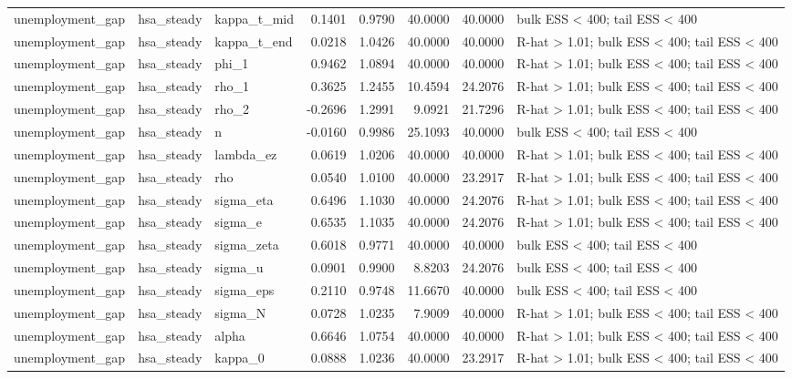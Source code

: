 \begin{tabular}{lllrrrrl}
unemployment\_gap & hsa\_steady & kappa\_t\_mid & 0.1401 & 0.9790 & 40.0000 & 40.0000 & bulk ESS < 400; tail ESS < 400 \\
unemployment\_gap & hsa\_steady & kappa\_t\_end & 0.0218 & 1.0426 & 40.0000 & 40.0000 & R-hat > 1.01; bulk ESS < 400; tail ESS < 400 \\
unemployment\_gap & hsa\_steady & phi\_1 & 0.9462 & 1.0894 & 40.0000 & 40.0000 & R-hat > 1.01; bulk ESS < 400; tail ESS < 400 \\
unemployment\_gap & hsa\_steady & rho\_1 & 0.3625 & 1.2455 & 10.4594 & 24.2076 & R-hat > 1.01; bulk ESS < 400; tail ESS < 400 \\
unemployment\_gap & hsa\_steady & rho\_2 & -0.2696 & 1.2991 & 9.0921 & 21.7296 & R-hat > 1.01; bulk ESS < 400; tail ESS < 400 \\
unemployment\_gap & hsa\_steady & n & -0.0160 & 0.9986 & 25.1093 & 40.0000 & bulk ESS < 400; tail ESS < 400 \\
unemployment\_gap & hsa\_steady & lambda\_ez & 0.0619 & 1.0206 & 40.0000 & 40.0000 & R-hat > 1.01; bulk ESS < 400; tail ESS < 400 \\
unemployment\_gap & hsa\_steady & rho & 0.0540 & 1.0100 & 40.0000 & 23.2917 & R-hat > 1.01; bulk ESS < 400; tail ESS < 400 \\
unemployment\_gap & hsa\_steady & sigma\_eta & 0.6496 & 1.1030 & 40.0000 & 24.2076 & R-hat > 1.01; bulk ESS < 400; tail ESS < 400 \\
unemployment\_gap & hsa\_steady & sigma\_e & 0.6535 & 1.1035 & 40.0000 & 24.2076 & R-hat > 1.01; bulk ESS < 400; tail ESS < 400 \\
unemployment\_gap & hsa\_steady & sigma\_zeta & 0.6018 & 0.9771 & 40.0000 & 40.0000 & bulk ESS < 400; tail ESS < 400 \\
unemployment\_gap & hsa\_steady & sigma\_u & 0.0901 & 0.9900 & 8.8203 & 24.2076 & bulk ESS < 400; tail ESS < 400 \\
unemployment\_gap & hsa\_steady & sigma\_eps & 0.2110 & 0.9748 & 11.6670 & 40.0000 & bulk ESS < 400; tail ESS < 400 \\
unemployment\_gap & hsa\_steady & sigma\_N & 0.0728 & 1.0235 & 7.9009 & 40.0000 & R-hat > 1.01; bulk ESS < 400; tail ESS < 400 \\
unemployment\_gap & hsa\_steady & alpha & 0.6646 & 1.0754 & 40.0000 & 40.0000 & R-hat > 1.01; bulk ESS < 400; tail ESS < 400 \\
unemployment\_gap & hsa\_steady & kappa\_0 & 0.0888 & 1.0236 & 40.0000 & 23.2917 & R-hat > 1.01; bulk ESS < 400; tail ESS < 400 \\

\end{tabular}

